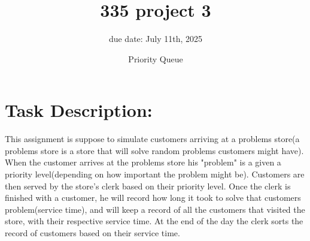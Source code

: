 \documentclass{article}
\title{335 project 3}
\author{due date: July 11th, 2025}
\date{Priority Queue}
\begin{document}
\maketitle
\section{Task Description:}
This assignment is suppose to simulate customers arriving at a problems 
store(a problems store is a store that will solve random problems customers might have).
When the customer arrives at the problems store his "problem" is a given a priority 
level(depending on how important the problem might be). Customers are then served by 
the store's clerk based on their priority level. Once the clerk is finished with a customer,
he will record how long it took to solve that customers problem(service time), and will keep
a record of all the customers that visited the store, with their respective service time. At the end of 
the day the clerk sorts the record of customers based on their service time.  
\end{document}
